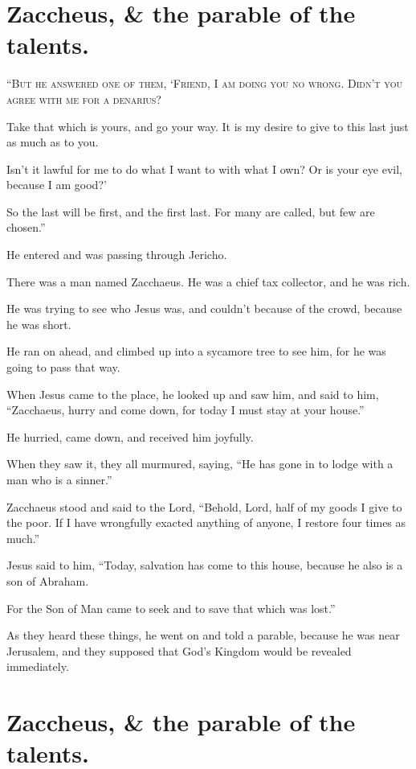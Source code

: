 \clearpage \section*{Zaccheus, \& the parable of the talents.}

\lettrine{“}{But he answered one of them, ‘Friend, I am doing you no wrong. Didn’t you agree with me for a denarius?}

Take that which is yours, and go your way. It is my desire to give to this last just as much as to you.

Isn’t it lawful for me to do what I want to with what I own? Or is your eye evil, because I am good?’

So the last will be first, and the first last. For many are called, but few are chosen.”

He entered and was passing through Jericho.

There was a man named Zacchaeus. He was a chief tax collector, and he was rich.

He was trying to see who Jesus was, and couldn’t because of the crowd, because he was short.

He ran on ahead, and climbed up into a sycamore tree to see him, for he was going to pass that way.

When Jesus came to the place, he looked up and saw him, and said to him, “Zacchaeus, hurry and come down, for today I must stay at your house.”

He hurried, came down, and received him joyfully.

When they saw it, they all murmured, saying, “He has gone in to lodge with a man who is a sinner.”

Zacchaeus stood and said to the Lord, “Behold, Lord, half of my goods I give to the poor. If I have wrongfully exacted anything of anyone, I restore four times as much.”

Jesus said to him, “Today, salvation has come to this house, because he also is a son of Abraham.

For the Son of Man came to seek and to save that which was lost.”

As they heard these things, he went on and told a parable, because he was near Jerusalem, and they supposed that God’s Kingdom would be revealed immediately.


\clearpage \section*{Zaccheus, \& the parable of the talents.}

